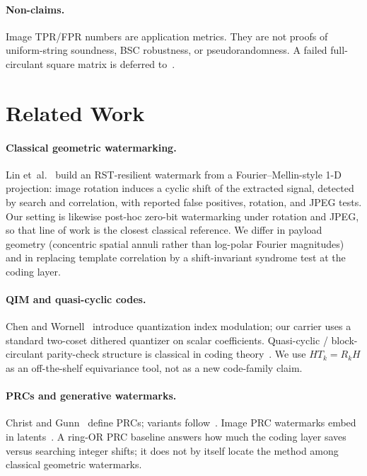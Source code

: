 \documentclass[11pt,a4paper]{article}
\begin{document}
\paragraph{Non-claims.}
Image TPR/FPR numbers are application metrics.
They are not proofs of uniform-string soundness, BSC robustness, or
pseudorandomness.
A failed full-circulant square matrix is deferred to~.

\section{Related Work}
\label{sec:related}

\paragraph{Classical geometric watermarking.}
Lin et~al.~\cite{lin2001rst} build an RST-resilient watermark from a
Fourier--Mellin-style 1-D projection: image rotation induces a cyclic shift of the
extracted signal, detected by search and correlation, with reported false positives,
rotation, and JPEG tests.
Our setting is likewise post-hoc zero-bit watermarking under rotation and JPEG, so
that line of work is the closest classical reference.
We differ in payload geometry (concentric spatial annuli rather than log-polar
Fourier magnitudes) and in replacing template correlation by a shift-invariant
syndrome test at the coding layer.

\paragraph{QIM and quasi-cyclic codes.}
Chen and Wornell~\cite{chen2001qim} introduce quantization index modulation; our
carrier uses a standard two-coset dithered quantizer on scalar coefficients.
Quasi-cyclic / block-circulant parity-check structure is classical in coding
theory~\cite{townsend1967cyclic,fossorier2004qc,misoczki2013mdpc}.
We use \(HT_k=R_kH\) as an off-the-shelf equivariance tool, not as a new code-family
claim.

\paragraph{PRCs and generative watermarks.}
Christ and Gunn~\cite{christ2024prc} define PRCs; variants
follow~\cite{alrabiah2025ideal,christ2025permuted,golowich2024edit}.
Image PRC watermarks embed in latents~\cite{gunn2024undetectable}.
A ring-OR PRC baseline answers how much the coding layer saves versus searching
integer shifts; it does not by itself locate the method among classical geometric
watermarks.
\end{document}
